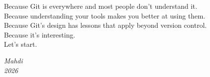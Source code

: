 Because Git is everywhere and most people don't understand it.\\
Because understanding your tools makes you better at using them.\\
Because Git's design has lessons that apply beyond version control.\\
Because it's interesting.\\
Let's start.

\vfill
\begin{flushright}
	\textit{Mahdi}\\
	\textit{2026}
\end{flushright}

\clearpage

